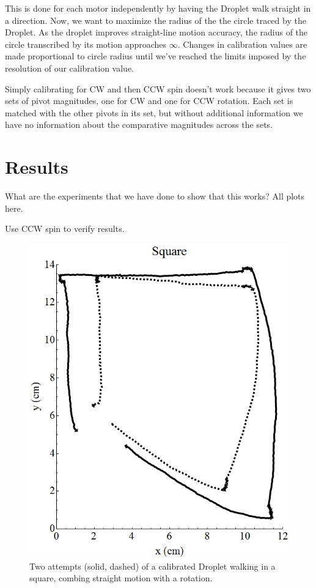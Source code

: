 \documentclass[letterpaper, 10pt, conference]{ieeeconf}
\begin{document}
This is done for each motor independently by having the Droplet walk straight in a direction. Now, we want to maximize the radius of the the circle traced by the Droplet. As the droplet improves straight-line motion accuracy, the radius of the circle transcribed by its motion approaches $\infty$. Changes in calibration values are made proportional to circle radius until we've reached the limits imposed by the resolution of our calibration value.

Simply calibrating for CW and then CCW spin doesn't work because it gives two sets of pivot magnitudes, one for CW and one for CCW rotation. Each set is matched with the other pivots in its set, but without additional information we have no information about the comparative magnitudes across the sets.




\section{Results}

What are the experiments that we have done to show that this works? All plots here.

Use CCW spin to verify results.

\begin{figure}
\centering
\includegraphics[width=\linewidth]{Images/dropletWalksSquare}
\caption{Two attempts (solid, dashed) of a calibrated Droplet walking in a square, combing straight motion with a rotation.}
\label{fig:someting}
\end{figure}
\end{document}
